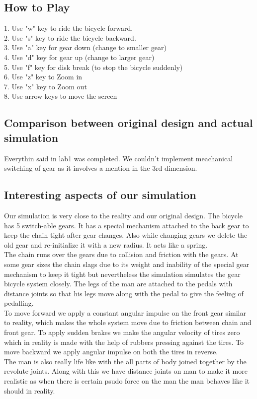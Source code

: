 \documentclass[11pt]{article}
\begin{document}
\subsection{How to Play}
1. Use "w" key to ride the bicycle forward.\\
2. Use "s" key to ride the bicycle backward.\\
3. Use "a" key for gear down (change to smaller gear)\\
4. Use "d" key for gear up (change to larger gear)\\
5. Use "f" key for disk break (to stop the bicycle suddenly)\\
6. Use "z" key to Zoom in\\
7. Use "x" key to Zoom out\\
8. Use arrow keys to move the screen\\
\subsection{Comparison between original design and actual simulation}
Everythin said in lab1 was completed. We couldn't implement meachanical switching of gear as it involves a mention in the 3rd dimension.
\subsection{Interesting aspects of our simulation}
Our simulation is very close to the reality and our original design. The bicycle has 5 switch-able gears. It has a special mechanism attached to the back gear to keep the chain tight after gear changes. Also while changing gears we delete the old gear and re-initialize it with a new radius. It acts like a spring.\\
The chain runs over the gears due to collision and friction with the gears. At some gear sizes the chain slags due to its weight and inability of the special gear mechanism to keep it tight but nevertheless the simulation simulates the gear bicycle system closely. The legs of the man are attached to the pedals with distance joints so that his legs move along with the pedal to give the feeling of pedalling.\\
To move forward we apply a constant angular impulse on the front gear similar to reality, which makes the whole system move due to friction between chain and front gear. To apply sudden brakes we make the angular velocity of tires zero which in reality is made with the help of rubbers pressing against the tires. To move backward we apply angular impulse on both the tires in reverse.\\
The man is also really life like with the all parts of body joined together by the revolute joints. Along with this we have distance joints on man to make it more realistic as when there is certain psudo force on the man the man behaves like it should in reality.       
\end{document}
